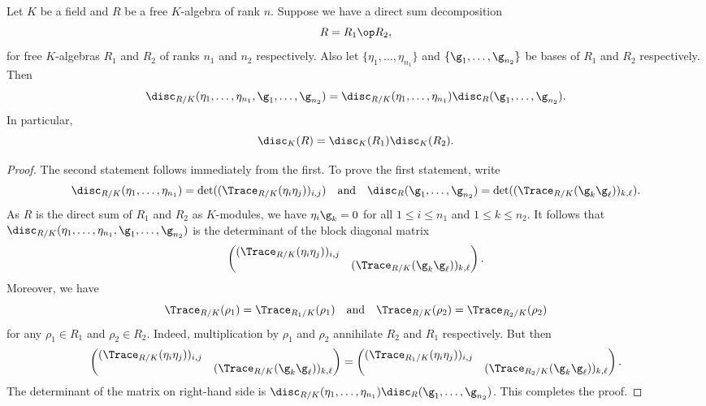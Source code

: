     \begin{proposition}\label{prop:discriminant_and_direct_sums}
      Let $K$ be a field and $R$ be a free $K$-algebra of rank $n$. Suppose we have a direct sum decomposition
      \[
        R = R_{1} \op R_{2},
      \]
      for free $K$-algebras $R_{1}$ and $R_{2}$ of ranks $n_{1}$ and $n_{2}$ respectively. Also let $\{\eta_{1},\ldots,\eta_{n_{1}}\}$ and $\{\g_{1},\ldots,\g_{n_{2}}\}$ be bases of $R_{1}$ and $R_{2}$ respectively. Then
      \[
        \disc_{R/K}(\eta_{1},\ldots,\eta_{n_{1}},\g_{1},\ldots,\g_{n_{2}}) = \disc_{R/K}(\eta_{1},\ldots,\eta_{n_{1}})\disc_{R}(\g_{1},\ldots,\g_{n_{2}}).
      \]
      In particular,
      \[
        \disc_{K}(R) = \disc_{K}(R_{1})\disc_{K}(R_{2}).
      \]
    \end{proposition}
    \begin{proof}
      The second statement follows immediately from the first. To prove the first statement, write
      \[
        \disc_{R/K}(\eta_{1},\ldots,\eta_{n_{1}}) = \det((\Trace_{R/K}(\eta_{i}\eta_{j}))_{i,j}) \quad \text{and} \quad \disc_{R}(\g_{1},\ldots,\g_{n_{2}}) = \det((\Trace_{R/K}(\g_{k}\g_{\ell}))_{k,\ell}).
      \]
      As $R$ is the direct sum of $R_{1}$ and $R_{2}$ as $K$-modules, we have $\eta_{i}\g_{k} = 0$ for all $1 \le i \le n_{1}$ and $1 \le k \le n_{2}$. It follows that $\disc_{R/K}(\eta_{1},\ldots,\eta_{n_{1}},\g_{1},\ldots,\g_{n_{2}})$ is the determinant of the block diagonal matrix
      \[
        \begin{pmatrix} (\Trace_{R/K}(\eta_{i}\eta_{j}))_{i,j} & \\ & (\Trace_{R/K}(\g_{k}\g_{\ell}))_{k,\ell} \end{pmatrix}.
      \]
      Moreover, we have
      \[
        \Trace_{R/K}(\rho_{1}) = \Trace_{R_{1}/K}(\rho_{1}) \quad \text{and} \quad \Trace_{R/K}(\rho_{2}) = \Trace_{R_{2}/K}(\rho_{2})
      \]
      for any $\rho_{1} \in R_{1}$ and $\rho_{2} \in R_{2}$. Indeed, multiplication by $\rho_{1}$ and $\rho_{2}$ annihilate $R_{2}$ and $R_{1}$ respectively. But then
      \[
        \begin{pmatrix} (\Trace_{R/K}(\eta_{i}\eta_{j}))_{i,j} & \\ & (\Trace_{R/K}(\g_{k}\g_{\ell}))_{k,\ell} \end{pmatrix} = \begin{pmatrix} (\Trace_{R_{1}/K}(\eta_{i}\eta_{j}))_{i,j} & \\ & (\Trace_{R_{2}/K}(\g_{k}\g_{\ell}))_{k,\ell} \end{pmatrix}.
      \]
      The determinant of the matrix on right-hand side is $\disc_{R/K}(\eta_{1},\ldots,\eta_{n_{1}})\disc_{R}(\g_{1},\ldots,\g_{n_{2}})$. This completes the proof.
    \end{proof}
    
